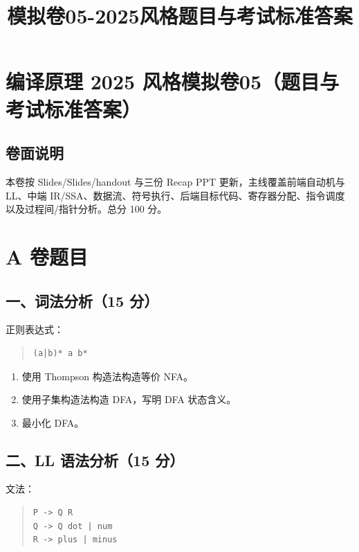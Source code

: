 \documentclass[UTF8,zihao=-4]{ctexart}
\title{模拟卷05-2025风格题目与考试标准答案}
\author{}
\date{}
\begin{document}
\maketitle
\setcounter{tocdepth}{1}
\tableofcontents
\newpage
\section{编译原理 2025 风格模拟卷05（题目与考试标准答案）}


\subsection{卷面说明}


本卷按 Slides/Slides/handout 与三份 Recap PPT 更新，主线覆盖前端自动机与 LL、中端 IR/SSA、数据流、符号执行、后端目标代码、寄存器分配、指令调度以及过程间/指针分析。总分 100 分。


\section{A 卷题目}


\subsection{一、词法分析（15 分）}


正则表达式：


\begin{quote}
\footnotesize
\begin{verbatim}
(a|b)* a b*
\end{verbatim}
\end{quote}


\begin{enumerate}
\item 使用 Thompson 构造法构造等价 NFA。
\item 使用子集构造法构造 DFA，写明 DFA 状态含义。
\item 最小化 DFA。
\end{enumerate}


\subsection{二、LL 语法分析（15 分）}


文法：


\begin{quote}
\footnotesize
\begin{verbatim}
P -> Q R
Q -> Q dot | num
R -> plus | minus
\end{verbatim}
\end{quote}
\end{document}
